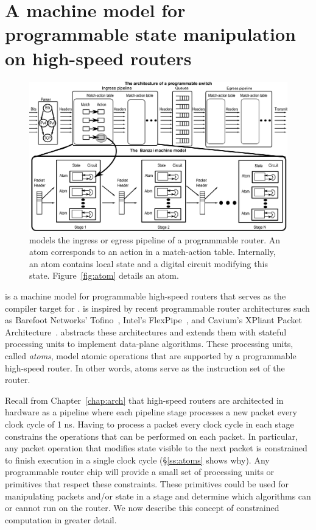\section{A machine model for programmable state manipulation on high-speed routers}
\label{s:absmachine}
\begin{figure}[!t]
  \includegraphics[width=\textwidth]{domino_banzai.pdf}
  \caption{\absmachine models the ingress or egress pipeline of a
  programmable router. An atom corresponds to an action in a match-action
  table. Internally, an atom contains local state and a digital circuit 
  modifying this state. Figure~\ref{fig:atom} details an atom.}
  \label{domino_fig:router}
\end{figure}

\absmachine is a machine model for programmable high-speed routers that serves
as the compiler target for \pktlanguage.  \absmachine is inspired by recent
programmable router architectures such as Barefoot Networks'
Tofino~\cite{tofino}, Intel's FlexPipe~\cite{flexpipe}, and Cavium's XPliant
Packet Architecture~\cite{xpliant}. \absmachine abstracts these architectures
and extends them with stateful processing units to implement data-plane
algorithms.  These processing units, called {\em atoms}, model atomic
operations that are supported by a programmable high-speed router. In other
words, atoms serve as the instruction set of the router.

Recall from Chapter~\ref{chap:arch} that high-speed routers are architected in
hardware as a pipeline where each pipeline stage processes a new packet every
clock cycle of 1 ns.  Having to process a packet every clock cycle in each
stage constrains the operations that can be performed on each packet. In
particular, any packet operation that modifies state visible to the next packet
is constrained to finish execution in a single clock cycle (\S\ref{ss:atoms}
shows why). Any programmable router chip will provide a small set of processing
units or primitives that respect these constraints. These primitives could be
used for manipulating packets and/or state in a stage and determine which
algorithms can or cannot run on the router. We now describe this concept of
constrained computation in greater detail.

